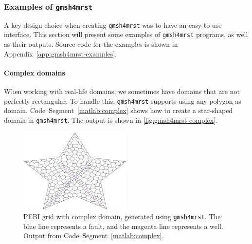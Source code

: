 
\subsubsection{Examples of \texttt{gmsh4mrst}}
\label{sec:gmsh4mrst-examples}
A key design choice when creating \verb|gmsh4mrst| was to have an easy-to-use interface. This section will present some examples of \verb|gmsh4mrst| programs, as well as their outputs. Source code for the examples is shown in Appendix~\ref{app:gmsh4mrst-examples}.

\paragraph{Complex domains}
When working with real-life domains, we sometimes have domains that are not perfectly rectangular. To handle this, \verb|gmsh4mrst| supports using any polygon as domain. Code~Segment~\ref{matlab:complex} shows how to create a star-shaped domain in \verb|gmsh4mrst|. The output is shown in \autoref{fig:gmsh4mrst-complex}.

\begin{figure}[htp]
    \centering
    \includegraphics[width=0.5\textwidth]{report/Images/Combining software/gmsh4mrst examples/complex_domains.png}
    \caption[PEBI grid with complex domain, generated using \texttt{gmsh4mrst}]{PEBI grid with complex domain, generated using \texttt{gmsh4mrst}. The blue line represents a fault, and the magenta line represents a well. Output from Code~Segment~\ref{matlab:complex}.}
    \label{fig:gmsh4mrst-complex}
\end{figure}

